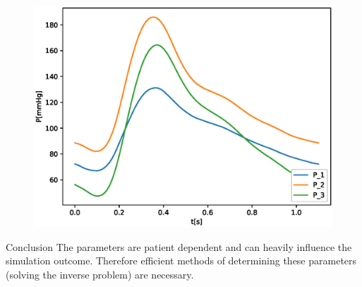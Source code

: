 \documentclass{beamer}
\begin{document}
\begin{frame}
\begin{figure}
\begin{center}
\begin{minipage}[t][0.35\paperheight][t]{\textwidth}
\begin{minipage}{0.44\textwidth}
				\includegraphics[width=\textwidth]{images/compare_output_params_P_P.eps}
			\end{minipage}
		\end{minipage}
		\end{center}
	\end{figure}
\begin{minipage}[t][0.45\paperheight][t]{\textwidth}
	\hfill
	\begin{block}{Conclusion}
		The parameters are patient dependent and can heavily influence the simulation outcome. Therefore efficient methods of determining these parameters (solving the inverse problem) are necessary.
	\end{block}
		\end{minipage}
\end{frame}
\end{document}
